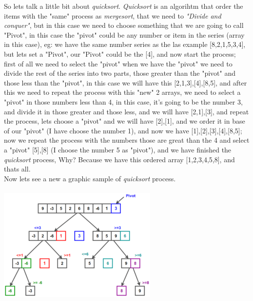 \documentclass[12pt, letterpaper]{article}
\begin{document}
So lets talk a little bit about \textit{quicksort}. \textit{Quicksort} is an algorihtm that order the items with the "same" process as \textit{mergesort}, that we need to \textit{"Divide and conquer"}, but in this case we need to choose something that we are going to call "Pivot", in this case the "pivot" could be any number or item in the series (array in this case), eg: we have the same number series as the las example [8,2,1,5,3,4], but lets set a "Pivot", our "Pivot" could be the [4], and now start the process; first of all we need to select the "pivot" when we have the "pivot" we need to divide the rest of the series into two parts, those greater than the "pivot" and those less than the "pivot", in this case we will have this [2,1,3],[4],[8,5], and after this we need to repeat the process with this "new" 2 arrays, we need to select a "pivot" in those numbers less than 4, in this case, it's going to be the number 3, and divide it in those greater and those less, and we will have [2,1],[3], and repeat the process, lets choose a "pivot" and we will have [2],[1], and we order it in base of our "pivot" (I have choose the number 1), and now we have [1],[2],[3],[4],[8,5]; now we repeat the process with the numbers those are great than the 4 and select a "pivot" [5],[8] (I choose the number 5 as "pivot"), and we have finished the \textit{quicksort} process, Why? Because we have this ordered array [1,2,3,4,5,8], and thats all.
\\
Now lets see a new a graphic sample of \textit{quicksort} process.
\\
\\
\includegraphics[width=\textwidth]{quicksort-300x213.png}
\\
\end{document}
